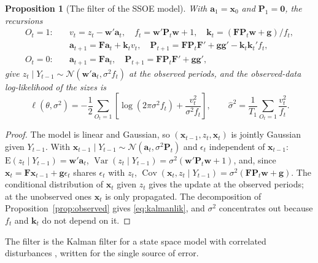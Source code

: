 \documentclass[11pt,a4paper]{article}
\newcommand{\vect}[1]{\mathbf{#1}}
\newcommand{\E}{\mathrm{E}}
\DeclareMathOperator{\Var}{Var}
\DeclareMathOperator{\Cov}{Cov}
\newtheorem{proposition}{Proposition}
\theoremstyle{remark}
\begin{document}
\begin{proposition}[The filter of the SSOE model]
\label{prop:kalman}
With $\vect a_1 = \vect x_0$ and $\vect P_1 = \vect 0$, the recursions
\begin{equation}
\begin{aligned}
O_t = 1:&\quad v_t = z_t - \vect w'\vect a_t,\quad f_t = \vect w'\vect P_t\vect w + 1,\quad
\vect k_t = (\vect F\vect P_t\vect w + \vect g)/f_t,\\
&\quad \vect a_{t+1} = \vect F\vect a_t + \vect k_t v_t,\quad
\vect P_{t+1} = \vect F\vect P_t\vect F' + \vect g\vect g' - \vect k_t\vect k_t' f_t,
\\
O_t = 0:&\quad \vect a_{t+1} = \vect F\vect a_t,\quad
\vect P_{t+1} = \vect F\vect P_t\vect F' + \vect g\vect g',
\end{aligned}
\label{eq:kalman}
\end{equation}
give $z_t\mid Y_{t-1}\sim\mathcal N(\vect w'\vect a_t,\sigma^2 f_t)$ at the observed periods, and the
observed-data log-likelihood of the sizes is
\begin{equation}
\ell(\theta,\sigma^2) = -\frac12\sum_{O_t=1}\left[\log(2\pi\sigma^2 f_t) +
\frac{v_t^2}{\sigma^2 f_t}\right],\qquad
\hat\sigma^2 = \frac{1}{T_1}\sum_{O_t=1}\frac{v_t^2}{f_t}.
\label{eq:kalmanlik}
\end{equation}
\end{proposition}

\begin{proof}
The model is linear and Gaussian, so $(\vect x_{t-1}, z_t, \vect x_t)$ is jointly Gaussian given
$Y_{t-1}$. With $\vect x_{t-1}\mid Y_{t-1}\sim\mathcal N(\vect a_t,\sigma^2\vect P_t)$ and $\epsilon_t$
independent of $\vect x_{t-1}$: $\E(z_t\mid Y_{t-1}) = \vect w'\vect a_t$,
$\Var(z_t\mid Y_{t-1}) = \sigma^2(\vect w'\vect P_t\vect w + 1)$, and, since
$\vect x_t = \vect F\vect x_{t-1} + \vect g\epsilon_t$ shares $\epsilon_t$ with $z_t$,
$\Cov(\vect x_t, z_t\mid Y_{t-1}) = \sigma^2(\vect F\vect P_t\vect w + \vect g)$. The conditional
distribution of $\vect x_t$ given $z_t$ gives the update at the observed periods; at the unobserved
ones $\vect x_t$ is only propagated. The decomposition of Proposition~\ref{prop:observed} gives
\eqref{eq:kalmanlik}, and $\sigma^2$ concentrates out because $f_t$ and $\vect k_t$ do not depend on
it.
\end{proof}

The filter is the Kalman filter for a state space model with correlated disturbances
\citep{Harvey1989,DurbinKoopman2012}, written for the single source of error.
\end{document}
